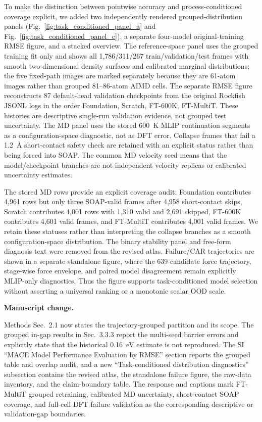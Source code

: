To make the distinction between pointwise accuracy and process-conditioned coverage explicit, we added two independently rendered grouped-distribution panels (Fig.~\ref{fig:task_conditioned_panel_a} and Fig.~\ref{fig:task_conditioned_panel_c}), a separate four-model original-training RMSE figure, and a stacked overview. The reference-space panel uses the grouped training fit only and shows all 1,786/311/267 train/validation/test frames with smooth two-dimensional density surfaces and calibrated marginal distributions; the five fixed-path images are marked separately because they are 61-atom images rather than grouped 81--86-atom AIMD cells. The separate RMSE figure reconstructs 87 default-head validation checkpoints from the original Rockfish JSONL logs in the order Foundation, Scratch, FT-600K, FT-MultiT. These histories are descriptive single-run validation evidence, not grouped test uncertainty. The MD panel uses the stored 600~K MLIP continuation segments as a configuration-space diagnostic, not as DFT error. Collapse frames that fail a 1.2~\AA{} short-contact safety check are retained with an explicit status rather than being forced into SOAP. The common MD velocity seed means that the model/checkpoint branches are not independent velocity replicas or calibrated uncertainty estimates.

The stored MD rows provide an explicit coverage audit: Foundation contributes 4,961 rows but only three SOAP-valid frames after 4,958 short-contact skips, Scratch contributes 4,001 rows with 1,310 valid and 2,691 skipped, FT-600K contributes 4,601 valid frames, and FT-MultiT contributes 4,001 valid frames. We retain these statuses rather than interpreting the collapse branches as a smooth configuration-space distribution. The binary stability panel and free-form diagnosis text were removed from the revised atlas. Failure/CAR trajectories are shown in a separate standalone figure, where the 639-candidate force trajectory, stage-wise force envelope, and paired model disagreement remain explicitly MLIP-only diagnostics. Thus the figure supports task-conditioned model selection without asserting a universal ranking or a monotonic scalar OOD scale.

\noindent\textbf{Manuscript change.}

Methods Sec.~2.1 now states the trajectory-grouped partition and its scope. The grouped in-gap results in Sec.~3.3.3 report the multi-seed barrier errors and explicitly state that the historical 0.16~eV estimate is not reproduced. The SI ``MACE Model Performance Evaluation by RMSE'' section reports the grouped table and overlap audit, and a new ``Task-conditioned distribution diagnostics'' subsection contains the revised atlas, the standalone failure figure, the raw-data inventory, and the claim-boundary table. The response and captions mark FT-MultiT grouped retraining, calibrated MD uncertainty, short-contact SOAP coverage, and full-cell DFT failure validation as the corresponding descriptive or validation-gap boundaries.

